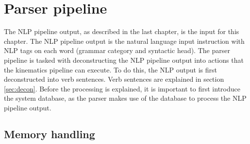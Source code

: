 \chapter{Parser pipeline}\label{ch:parser_pipeline}


The NLP pipeline output, as described in the last chapter, is the input for this chapter. The NLP pipeline output is the natural language input instruction with NLP tags on each word (grammar category and syntactic head). The parser pipeline is tasked with deconstructing the NLP pipeline output into actions that the kinematics pipeline can execute. To do this, the NLP output is first deconstructed into verb sentences. Verb sentences are explained in section \ref{sec:decon}. Before the processing is explained, it is important to first introduce the system database, as the parser makes use of the database to process the NLP pipeline output.

\section{Memory handling}\label{sec:mem}

